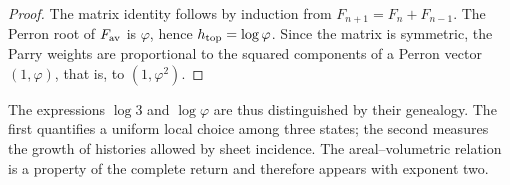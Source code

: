\begin{proof}
The matrix identity follows by induction from
\(F_{n+1}=F_n+F_{n-1}\). The Perron root of \(F_{\rm av}\) is \(\varphi\),
hence \(h_{\rm top}=\log\varphi\). Since the matrix is symmetric, the Parry
weights \cite{v:Parry1964} are proportional to the squared components of a Perron vector
\((1,\varphi)\), that is, to \((1,\varphi^2)\).
\end{proof}

The expressions \(\log3\) and \(\log\varphi\) are thus distinguished by their
genealogy. The first quantifies a uniform local choice among three
states; the second measures the growth of histories allowed by
sheet incidence. The areal--volumetric relation is a property of the
complete return and therefore appears with exponent two.

